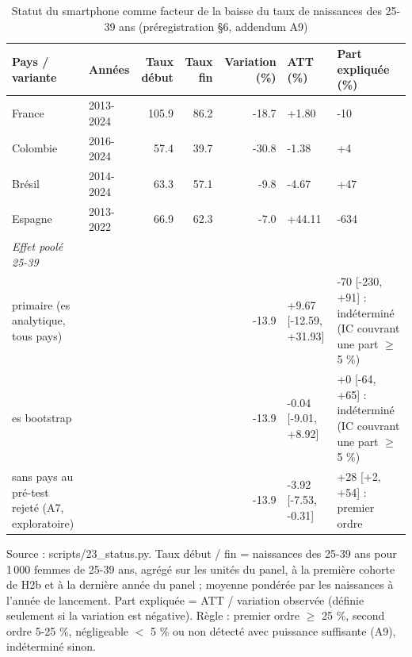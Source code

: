 \begin{table}[htbp]\centering
\begin{threeparttable}
\caption{Statut du smartphone comme facteur de la baisse du taux de naissances des 25-39 ans (préregistration §6, addendum A9)}\label{tab:status}
\footnotesize
\begin{tabular}{p{2.6cm}lrrrp{2.1cm}p{2.9cm}}
\toprule
Pays / variante & Années & Taux début & Taux fin & Variation (\%) & ATT (\%) & Part expliquée (\%) \\
\midrule
France & 2013-2024 & 105.9 & 86.2 & -18.7 & +1.80 & -10 \\
Colombie & 2016-2024 & 57.4 & 39.7 & -30.8 & -1.38 & +4 \\
Brésil & 2014-2024 & 63.3 & 57.1 & -9.8 & -4.67 & +47 \\
Espagne & 2013-2022 & 66.9 & 62.3 & -7.0 & +44.11 & -634 \\
\midrule \emph{Effet poolé 25-39} &  &  &  &  &  &  \\
primaire (es analytique, tous pays) &  &  &  & -13.9 & +9.67 [-12.59, +31.93] & -70 [-230, +91] : indéterminé (IC couvrant une part $\geq$ 5 \%) \\
es bootstrap &  &  &  & -13.9 & -0.04 [-9.01, +8.92] & +0 [-64, +65] : indéterminé (IC couvrant une part $\geq$ 5 \%) \\
sans pays au pré-test rejeté (A7, exploratoire) &  &  &  & -13.9 & -3.92 [-7.53, -0.31] & +28 [+2, +54] : premier ordre \\
\bottomrule
\end{tabular}
\begin{tablenotes}\footnotesize
\item Source : scripts/23\_status.py. Taux début / fin = naissances des 25-39 ans pour 1\,000 femmes de 25-39 ans, agrégé sur les unités du panel, à la première cohorte de H2b et à la dernière année du panel ; moyenne pondérée par les naissances à l'année de lancement. Part expliquée = ATT / variation observée (définie seulement si la variation est négative). Règle : premier ordre $\geq$ 25 \%, second ordre 5-25 \%, négligeable $<$ 5 \% ou non détecté avec puissance suffisante (A9), indéterminé sinon.
\end{tablenotes}
\end{threeparttable}
\end{table}
